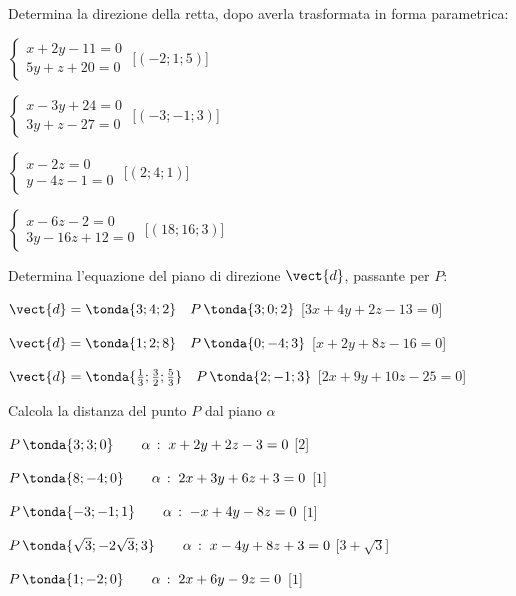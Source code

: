 \begin{esercizio}
Determina la direzione della retta, dopo averla trasformata in forma parametrica:
\begin{multicols}{2}
 \begin{enumeratea}
  \item  \(\begin{cases}
x+2y-11=0 \\
5y+z+20=0
\end{cases}\)    \hfill [\((-2;1;5)\)]
\item\(\begin{cases}
x-3y+24=0 \\
3y+z-27=0
\end{cases}\)    \hfill [\((-3;-1;3)\)]
\item\(\begin{cases}
x-2z=0 \\
y-4z-1=0
\end{cases}\)    \hfill [\((2;4;1)\)]
\item\(\begin{cases}
x-6z-2=0 \\
3y-16z+12=0
\end{cases}\)    \hfill [\((18;16;3)\)]
 \end{enumeratea}
 \end{multicols}
\end{esercizio}

\begin{esercizio}
Determina l'equazione del piano di direzione \(\vect{d}\), passante per \(P\):
 \begin{enumeratea}
  \item  \(\vect{d} = \tonda{3;4;2} \quad P\,\tonda{3;0;2}\)    \hfill [\(3x+4y+2z-13=0\)]
  \item  \(\vect{d} = \tonda{1;2;8} \quad P\,\tonda{0;-4;3}\)    \hfill [\(x+2y+8z-16=0\)]
  \item  \(\vect{d} = \tonda{\frac{1}{3};\frac{3}{2};\frac{5}{3}} \quad P\,\tonda{2;-1;3}\)    \hfill [\(2x+9y+10z-25=0\)]
 \end{enumeratea}
\end{esercizio}

\begin{esercizio}
Calcola la distanza del punto \(P\) dal piano \(\alpha\)
 \begin{enumeratea}
  \item  \(P\,\tonda{3;3;0} \qquad \alpha\,:\;x+2y+2z-3=0\)    \hfill [\(2\)]
  \item  \(P\,\tonda{8;-4;0} \qquad \alpha\,:\;2x+3y+6z+3=0\)    \hfill [\(1\)]
  \item  \(P\,\tonda{-3;-1;1} \qquad \alpha\,:\;-x+4y-8z=0\)    \hfill [\(1\)]
  \item  \(P\,\tonda{\sqrt{3};-2\sqrt{3};3} \qquad \alpha\,:\;x-4y+8z+3=0\)    \hfill [\(3+\sqrt{3}\)]
  \item  \(P\,\tonda{1;-2;0} \qquad \alpha\,:\;2x+6y-9z=0\)    \hfill [\(1\)]
 \end{enumeratea}
\end{esercizio}


